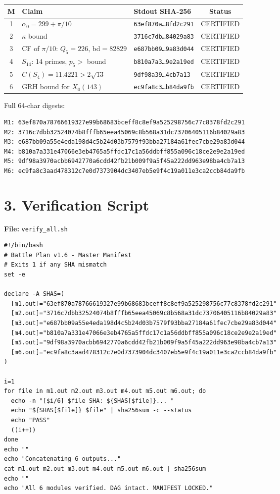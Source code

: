 \documentclass[11pt,letterpaper]{article}
\begin{document}
\begin{center}
\begin{tabular}{|c|l|l|c|}
\hline
\textbf{M} & \textbf{Claim} & \textbf{Stdout SHA-256} & \textbf{Status} \\
\hline
1 & $\alpha_0 = 299+\pi/10$ & \texttt{63ef870a\ldots8fd2c291} & \textcolor{certgreen}{CERTIFIED} \\
2 & $\kappa$ bound & \texttt{3716c7db\ldots84029a83} & \textcolor{certgreen}{CERTIFIED} \\
3 & CF of $\pi/10$: $Q_5=226$, bd$=82829$ & \texttt{e687bb09\ldots9a83d044} & \textcolor{certgreen}{CERTIFIED} \\
4 & $S_{14}$: 14 primes, $p_5 >$ bound & \texttt{b810a7a3\ldots9e2a19ed} & \textcolor{certgreen}{CERTIFIED} \\
5 & $C(S_4) = 11.4221 > 2\sqrt{13}$ & \texttt{9df98a39\ldots4cb7a13} & \textcolor{certgreen}{CERTIFIED} \\
6 & GRH bound for $X_0(143)$ & \texttt{ec9fa8c3\ldots b84da9fb} & \textcolor{certgreen}{CERTIFIED} \\
\hline
\end{tabular}
\end{center}

\noindent Full 64-char digests:
\begin{lstlisting}
M1: 63ef870a78766619327e99b68683bceff8c8ef9a525298756c77c8378fd2c291
M2: 3716c7dbb32524074b8fffb65eea45069c8b568a31dc73706405116b84029a83
M3: e687bb09a55e4eda198d4c5b24d03b7579f93bba27184a61fec7cbe29a83d044
M4: b810a7a331e47066e3eb4765a5ffdc17c1a56ddbff855a096c18ce2e9e2a19ed
M5: 9df98a3970acbb6942770a6cdd42fb21b009f9a5f45a222dd963e98ba4cb7a13
M6: ec9fa8c3aad478312c7e0d7373904dc3407eb5e9f4c19a011e3ca2ccb84da9fb
\end{lstlisting}

\section*{3. Verification Script}

\textbf{File:} \texttt{verify\_all.sh}
\begin{lstlisting}
#!/bin/bash
# Battle Plan v1.6 - Master Manifest
# Exits 1 if any SHA mismatch
set -e

declare -A SHAS=(
  [m1.out]="63ef870a78766619327e99b68683bceff8c8ef9a525298756c77c8378fd2c291"
  [m2.out]="3716c7dbb32524074b8fffb65eea45069c8b568a31dc73706405116b84029a83"
  [m3.out]="e687bb09a55e4eda198d4c5b24d03b7579f93bba27184a61fec7cbe29a83d044"
  [m4.out]="b810a7a331e47066e3eb4765a5ffdc17c1a56ddbff855a096c18ce2e9e2a19ed"
  [m5.out]="9df98a3970acbb6942770a6cdd42fb21b009f9a5f45a222dd963e98ba4cb7a13"
  [m6.out]="ec9fa8c3aad478312c7e0d7373904dc3407eb5e9f4c19a011e3ca2ccb84da9fb"
)

i=1
for file in m1.out m2.out m3.out m4.out m5.out m6.out; do
  echo -n "[$i/6] $file SHA: ${SHAS[$file]}... "
  echo "${SHAS[$file]} $file" | sha256sum -c --status
  echo "PASS"
  ((i++))
done
echo ""
echo "Concatenating 6 outputs..."
cat m1.out m2.out m3.out m4.out m5.out m6.out | sha256sum
echo ""
echo "All 6 modules verified. DAG intact. MANIFEST LOCKED."
\end{lstlisting}
\end{document}
